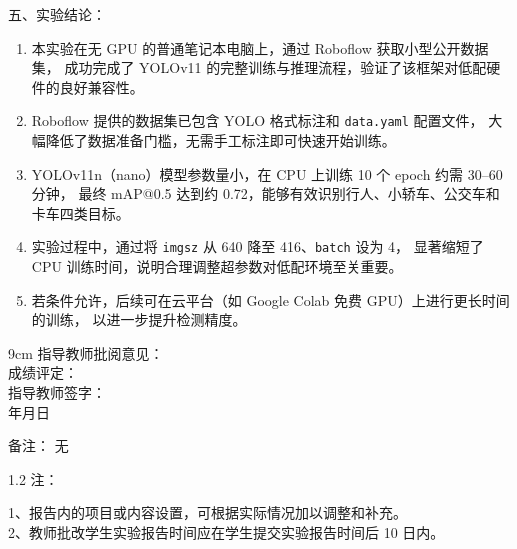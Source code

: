 \documentclass[12pt, a4paper]{article}
\begin{document}
 
\newpage
\begin{labbox}{五、实验结论：}{}
 
\begin{enumerate}[leftmargin=2em, itemsep=0.4em]
    \item 本实验在无 GPU 的普通笔记本电脑上，通过 Roboflow 获取小型公开数据集，
          成功完成了 YOLOv11 的完整训练与推理流程，验证了该框架对低配硬件的良好兼容性。
 
    \item Roboflow 提供的数据集已包含 YOLO 格式标注和 \texttt{data.yaml} 配置文件，
          大幅降低了数据准备门槛，无需手工标注即可快速开始训练。
 
    \item YOLOv11n（nano）模型参数量小，在 CPU 上训练 10 个 epoch 约需 30--60 分钟，
          最终 mAP@0.5 达到约 0.72，能够有效识别行人、小轿车、公交车和卡车四类目标。
 
    \item 实验过程中，通过将 \texttt{imgsz} 从 640 降至 416、\texttt{batch} 设为 4，
          显著缩短了 CPU 训练时间，说明合理调整超参数对低配环境至关重要。
 
    \item 若条件允许，后续可在云平台（如 Google Colab 免费 GPU）上进行更长时间的训练，
          以进一步提升检测精度。
\end{enumerate}
 
\end{labbox}
 
\begin{labbox}{}{9cm}
    \hspace{1em}指导教师批阅意见：\\[3.5cm]
    \hspace{1em}成绩评定：\\[2cm]
    \hfill 指导教师签字：\hspace{4em} \\
    \hfill \makebox[3em]{}年\makebox[2em]{}月\makebox[2em]{}日\hspace{2em} \\[0.5em]
\end{labbox}
 
\begin{labbox}{备注：}{}
    无
\end{labbox}
 
\begin{spacing}{1.2}
    \noindent 注：\begin{minipage}[t]{0.88\textwidth}
        1、报告内的项目或内容设置，可根据实际情况加以调整和补充。\\
        2、教师批改学生实验报告时间应在学生提交实验报告时间后 10 日内。
    \end{minipage}
\end{spacing}
 
\end{document}
